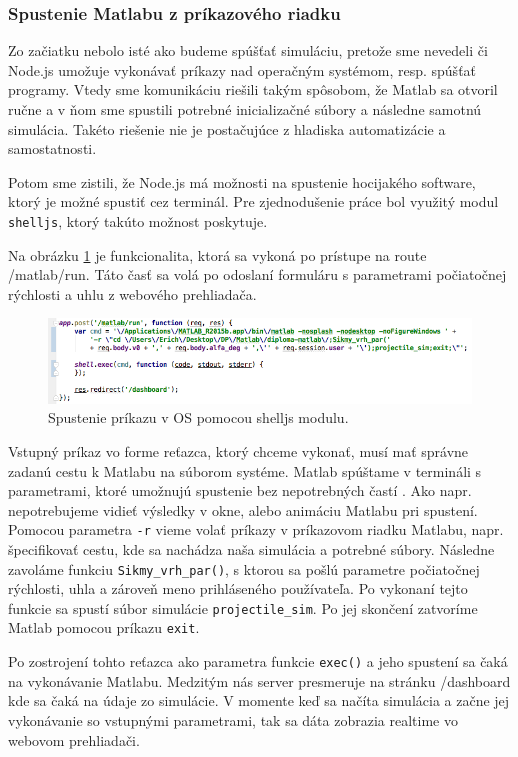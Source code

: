 \subsubsection{Spustenie Matlabu z príkazového riadku}
Zo začiatku nebolo isté ako budeme spúšťať simuláciu, pretože sme nevedeli či Node.js umožuje vykonávať príkazy nad operačným systémom, resp. spúšťať programy. Vtedy sme komunikáciu riešili takým spôsobom, že Matlab sa otvoril ručne a v ňom sme spustili potrebné inicializačné súbory a následne samotnú simulácia. Takéto riešenie nie je postačujúce z hladiska automatizácie a samostatnosti.

Potom sme zistili, že Node.js má možnosti na spustenie hocijakého software, ktorý je možné spustiť cez terminál. Pre zjednodušenie práce bol využitý modul \verb|shelljs|, ktorý takúto možnost poskytuje.

Na obrázku \ref{img-express-shelljs} je funkcionalita, ktorá sa vykoná po prístupe na route /matlab/run. Táto časť sa volá po odoslaní formuláru s parametrami počiatočnej rýchlosti a uhlu z webového prehliadača.

\begin{figure}[H]
  \centering
  \includegraphics[scale=0.6]{img/code/express-shelljs.png}
  \caption{Spustenie príkazu v OS pomocou shelljs modulu.}
  \label{img-express-shelljs}
\end{figure}

Vstupný príkaz vo forme reťazca, ktorý chceme vykonať, musí mať správne zadanú cestu k Matlabu na súborom systéme. Matlab spúštame v termináli s parametrami, ktoré umožnujú spustenie bez nepotrebných častí \cite{matlab-macos}. Ako napr. nepotrebujeme vidieť výsledky v okne, alebo animáciu Matlabu pri spustení. Pomocou parametra \verb|-r| vieme volať príkazy v príkazovom riadku Matlabu, napr. špecifikovať cestu, kde sa nachádza naša simulácia a potrebné súbory. Následne zavoláme funkciu \verb|Sikmy_vrh_par()|, s ktorou sa pošlú parametre počiatočnej rýchlosti, uhla a zároveň meno prihláseného používateľa. Po vykonaní tejto funkcie sa spustí súbor simulácie \verb|projectile_sim|. Po jej skončení zatvoríme Matlab pomocou príkazu \verb|exit|.

Po zostrojení tohto reťazca ako parametra funkcie \verb|exec()| a jeho spustení sa čaká na vykonávanie Matlabu. Medzitým nás server presmeruje na stránku /dashboard kde sa čaká na údaje zo simulácie. V momente keď sa načíta simulácia a začne jej vykonávanie so vstupnými parametrami, tak sa dáta zobrazia realtime vo webovom prehliadači.

